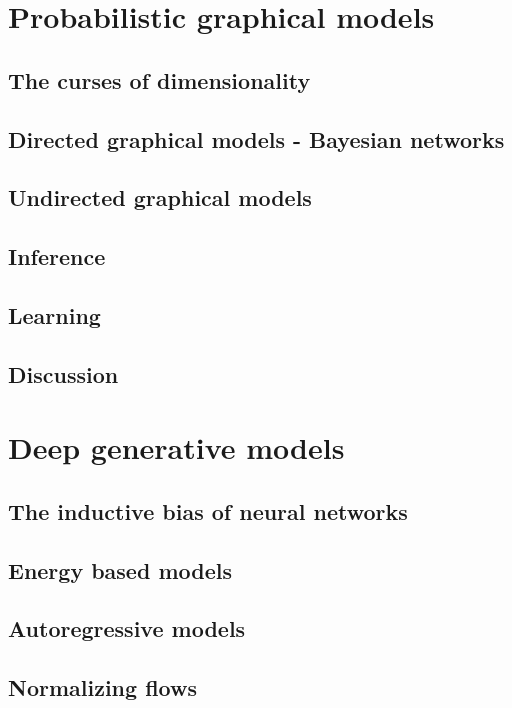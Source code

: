 \section{Probabilistic graphical models}

\subsection{The curses of dimensionality}

\subsection{Directed graphical models - Bayesian networks}

\subsection{Undirected graphical models}

\subsection{Inference}

\subsection{Learning}

\subsection{Discussion}

\section{Deep generative models}
\subsection{The inductive bias of neural networks}
\subsection{Energy based models}
\subsection{Autoregressive models}
\subsection{Normalizing flows}
